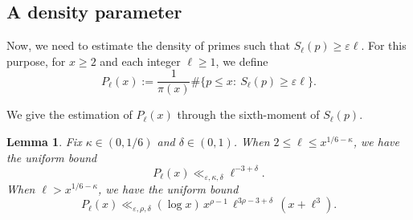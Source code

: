 \documentclass[11pt,letterpaper,reqno]{amsart}
\newtheorem{lemma}[theorem]{Lemma}
\theoremstyle{definition}
\numberwithin{equation}{section}
\newcommand{\eps}{\varepsilon}
\newcommand{\1}{\mathbf{1}}
\begin{document}
\subsection{A density parameter}


Now, we need to estimate the density of primes such that $S_\ell(p)\ge \eps \ell$. For this purpose, for $x\ge 2$ and each integer $\ell\ge 1$, we define
\begin{equation}
P_{\ell}(x):=\frac{1}{\pi(x)}\#\{p\le x:\ S_\ell(p)\ge \eps \ell\}.
\end{equation}




We give the estimation of $P_{\ell}(x)$ through the sixth-moment of $S_{\ell}(p)$. 

\begin{lemma}\label{thm:boundofam}
Fix $\kappa\in (0,1/6)$ and $\delta\in (0,1)$. When $2 \le \ell \le x^{1/6-\kappa}$, we have the uniform bound
\begin{equation}\label{eq:am-smallm}
P_\ell(x)\ll_{\eps,\kappa,\delta} \ell^{-3+\delta}.
\end{equation}
When $\ell>x^{1/6-\kappa}$, we have the uniform bound
\begin{equation}\label{eq:am-HB}
P_\ell(x)\ll_{\eps,\rho,\delta} (\log x)\,x^{\rho-1}\,\ell^{3\rho-3+\delta}\,(x+\ell^3).
\end{equation}
\end{lemma}
\end{document}
